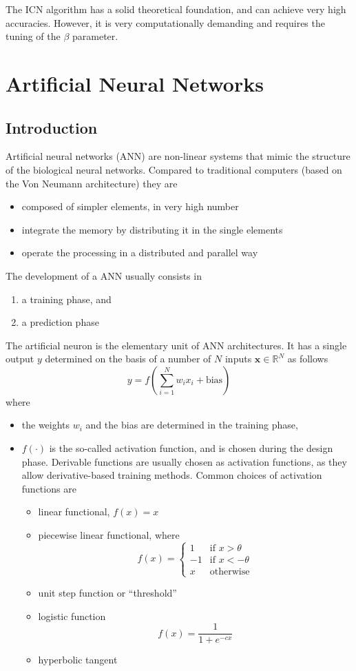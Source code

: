 \documentclass[oneside,onecolumn]{report}
\begin{document}
The ICN algorithm has a solid theoretical foundation, and can achieve very high accuracies.
However, it is very computationally demanding and requires the tuning of the $\beta$ parameter.


\clearpage
\chapter{Artificial Neural Networks}
\section{Introduction}
Artificial neural networks (ANN) are non-linear systems that mimic the structure of the biological neural networks.
Compared to traditional computers (based on the Von Neumann architecture) they are
\begin{itemize}
    \item composed of simpler elements, in very high number
    \item integrate the memory by distributing it in the single elements
    \item operate the processing in a distributed and parallel way
\end{itemize}

The development of a ANN usually consists in
\begin{enumerate}
    \item a training phase, and
    \item a prediction phase
\end{enumerate}

The artificial neuron is the elementary unit of ANN architectures.
It has a single output $y$ determined on the basis of a number of $N$ inputs $\bm x \in \mathbb R^N$ as follows
$$ y = f\left( \sum_{i = 1}^N w_i x_i + \text{bias} \right) $$
where
\begin{itemize}
    \item the weights $w_i$ and the bias are determined in the training phase,
    \item $f(\cdot)$ is the so-called activation function, and is chosen during the design phase.
    Derivable functions are usually chosen as activation functions, as they allow derivative-based training methods.
    Common choices of activation functions are
    \begin{itemize}
        \item linear functional, $f(x) = x$
        \item piecewise linear functional, where
        $$ f(x) = \begin{cases}
            1 & \text{if } x > \theta \\
            -1 & \text{if } x < -\theta \\
            x & \text{otherwise}
        \end{cases} $$
        \item unit step function or ``threshold''
        \item logistic function
        $$ f(x) = \frac{1}{1 + e^{-c x}} $$
        \item hyperbolic tangent
    \end{itemize}
\end{itemize}
\end{document}
